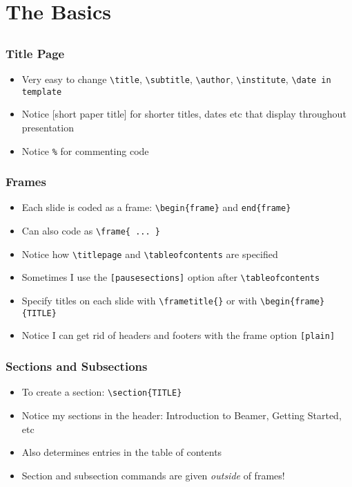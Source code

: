 \documentclass{beamer}
\begin{document}
\section{The Basics}
\subsection{}
\begin{frame}[fragile]
  \frametitle{Title Page}
  \begin{itemize}
  \item Very easy to change \verb|\title|, \verb|\subtitle|, \verb|\author|, \verb|\institute|, \verb|\date in template|
  \item Notice [short paper title] for shorter titles, dates etc that display throughout presentation
  \item Notice \verb|%| for commenting code
  \end{itemize}
\end{frame}

\begin{frame}
  \frametitle{Frames}
  \begin{itemize}
  \item Each slide is coded as a frame: \verb|\begin{frame}| and \verb|end{frame}|
  \item Can also code as \verb|\frame{ ... }|
  \item Notice how \verb|\titlepage| and \verb|\tableofcontents| are specified
  \item Sometimes I use the \verb|[pausesections]| option after \verb|\tableofcontents|
  \item Specify titles on each slide with \verb|\frametitle{}| or with \verb|\begin{frame}{TITLE}|
  \item Notice I can get rid of headers and footers with the frame option \verb|[plain]|
  \end{itemize}
\end{frame}

\begin{frame}[fragile]
  \frametitle{Sections and Subsections}
  \begin{itemize}
  \item To create a section: \verb|\section{TITLE}|
  \item Notice my sections in the header: Introduction to Beamer, Getting Started, etc
  \item Also determines entries in the table of contents
  \item Section and subsection commands are given \textit{outside} of frames!
  \end{itemize}
\end{frame}
\end{document}
